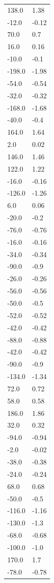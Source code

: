 \begin{longtable}{ll}
138.0 & 1.38 \\
-12.0 & -0.12 \\
70.0 & 0.7 \\
16.0 & 0.16 \\
-10.0 & -0.1 \\
-198.0 & -1.98 \\
-54.0 & -0.54 \\
-32.0 & -0.32 \\
-168.0 & -1.68 \\
-40.0 & -0.4 \\
164.0 & 1.64 \\
2.0 & 0.02 \\
146.0 & 1.46 \\
122.0 & 1.22 \\
-16.0 & -0.16 \\
-126.0 & -1.26 \\
6.0 & 0.06 \\
-20.0 & -0.2 \\
-76.0 & -0.76 \\
-16.0 & -0.16 \\
-34.0 & -0.34 \\
-90.0 & -0.9 \\
-26.0 & -0.26 \\
-56.0 & -0.56 \\
-50.0 & -0.5 \\
-52.0 & -0.52 \\
-42.0 & -0.42 \\
-88.0 & -0.88 \\
-42.0 & -0.42 \\
-90.0 & -0.9 \\
-134.0 & -1.34 \\
72.0 & 0.72 \\
58.0 & 0.58 \\
186.0 & 1.86 \\
32.0 & 0.32 \\
-94.0 & -0.94 \\
-2.0 & -0.02 \\
-38.0 & -0.38 \\
-24.0 & -0.24 \\
68.0 & 0.68 \\
-50.0 & -0.5 \\
-116.0 & -1.16 \\
-130.0 & -1.3 \\
-68.0 & -0.68 \\
-100.0 & -1.0 \\
170.0 & 1.7 \\
-78.0 & -0.78 \\

\end{longtable}
